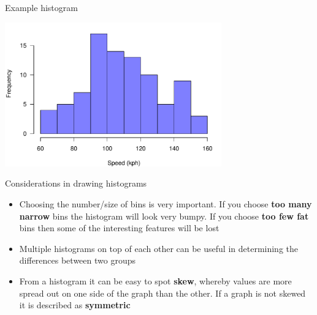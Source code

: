 \documentclass[12pt,xcolor=dvipsnames,handout,mathserif,aspectratio=169]{beamer}
\newcommand{\bbl}[1]{{\color{NavyBlue} \textbf{#1}}}
\newcommand{\bre}[1]{{\color{red} \textbf{#1}}}
\newcommand{\bgr}[1]{{\color{PineGreen} \textbf{#1}}}
\begin{document}
\begin{frame}{ Example histogram }
\begin{center}
\includegraphics[width=0.7\textwidth]{MaleSpeedHist.pdf}
\end{center}


\end{frame}

\begin{frame}{ Considerations in drawing histograms }

\begin{itemize}
\item Choosing the number/size of bins is very important. If you choose \bre{too many narrow} bins the histogram will look very bumpy. If you choose \bre{too few fat} bins then some of the interesting features will be lost
\pause
\item Multiple histograms on top of each other can be useful in determining the differences between two groups
\pause
\item From a histogram it can be easy to spot \bgr{skew}, whereby values are more spread out on one side of the graph than the other. If a graph is not skewed it is described as \bbl{symmetric}
\end{itemize}

\end{frame}
\end{document}
